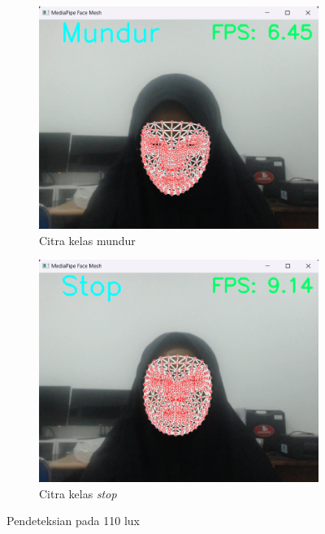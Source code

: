 \begin{figure}[H]
  \begin{subfigure}{0.3\textwidth}
      \centering
      \includegraphics[width=\linewidth]{gambar/110 mundur.png}
      \caption{Citra kelas mundur}
      \label{fig:image4}
  \end{subfigure}
  \hfill
  \begin{subfigure}{0.3\textwidth}
      \centering
      \includegraphics[width=\linewidth]{gambar/110 stop.png}
      \caption{Citra kelas \emph{stop}}
      \label{fig:image5}
  \end{subfigure}
  \caption{Pendeteksian pada 110 lux}
  \label{fig:110lux}
\end{figure}


